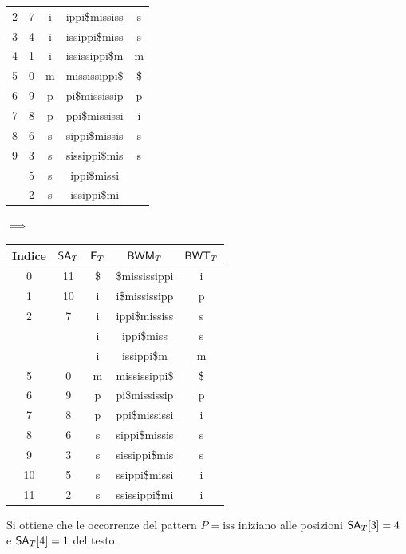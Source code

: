 \begin{esempio}
\begin{table}[H]
\begin{tabular}{c|c|c|c|c}
      2 & 7 & i & ippi\$mississ & s\\
      3 & 4 & i & issippi\$miss & s\\
      4 & 1 & i & ississippi\$m & m\\
      5 & 0 & m & mississippi\$ & \$\\
      6 & 9 & p & pi\$mississip & p\\
      7 & 8 & p & ppi\$mississi & i\\
      8 & 6 & s & sippi\$missis & s\\
      9 & 3 & s & sissippi\$mis & s\\
      {\color{nordred}{10}} & 5 & s & {\color{nordred}{ss}}ippi\$missi
      & {\color{nordgreen}{i}}\\
      {\color{nordred}{11}} & 2 & s & {\color{nordred}{ss}}issippi\$mi
      & {\color{nordgreen}{i}}\\
    \end{tabular}
    $\implies$
    \begin{tabular}{c|c|c|c|c} 
      \textbf{Indice} & $\mbox{\rm {\sf SA}}_T$ & $\mbox{\rm {\sf F}}_T$ & $\mbox{\rm {\sf BWM}}_T$
      & $\mbox{\rm {\sf BWT}}_T$\\ 
      \hline
      0 & 11 & \$ & \$mississippi & i\\
      1 & 10 & i & i\$mississipp & p\\
      2 & 7 & i & ippi\$mississ & s\\
      {\color{nordred}{3}} & {\color{nordgreen}{\underline{4}}} & i
                                        & {\color{nordred}{iss}}ippi\$miss & s\\
      {\color{nordred}{4}} & {\color{nordgreen}{\underline{1}}} & i
                                        & {\color{nordred}{iss}}issippi\$m & m\\
      5 & 0 & m & mississippi\$ & \$\\
      6 & 9 & p & pi\$mississip & p\\
      7 & 8 & p & ppi\$mississi & i\\
      8 & 6 & s & sippi\$missis & s\\
      9 & 3 & s & sissippi\$mis & s\\
      10 & 5 & s & ssippi\$missi & i\\
      11 & 2 & s & ssissippi\$mi & i\\
    \end{tabular}
  \end{table}
  Si ottiene che le occorrenze del pattern $P=\mbox{iss}$ iniziano alle
  posizioni $\mbox{\rm {\sf SA}}_T[3]=4$ e $\mbox{\rm {\sf SA}}_T[4]=1$ del testo.
\end{esempio}
